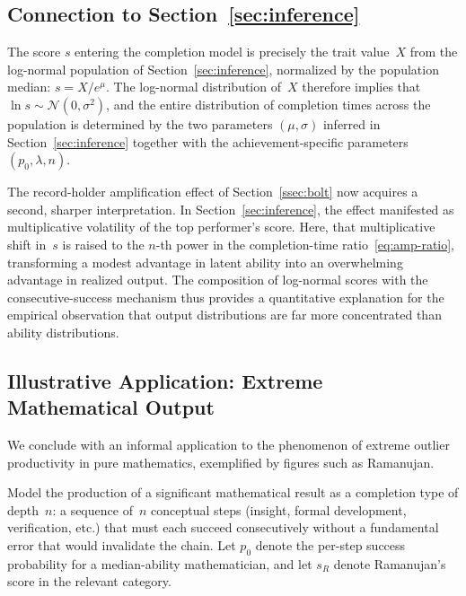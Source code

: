 \documentclass{article}
\begin{document}
\subsection{Connection to Section~\ref{sec:inference}}\label{ssec:connection}

The score $s$ entering the completion model is precisely the trait
value~$X$ from the log-normal population of
Section~\ref{sec:inference}, normalized by the population median:
$s = X / e^{\mu}$. The log-normal distribution of~$X$ therefore implies
that $\ln s \sim \mathcal{N}(0,\sigma^2)$, and the entire distribution
of completion times across the population is determined by the two
parameters $(\mu, \sigma)$ inferred in Section~\ref{sec:inference}
together with the achievement-specific parameters $(p_0, \lambda, n)$.

The record-holder amplification effect of Section~\ref{ssec:bolt} now
acquires a second, sharper interpretation. In Section~\ref{sec:inference},
the effect manifested as multiplicative volatility of the top performer's
score. Here, that multiplicative shift in~$s$ is raised to the $n$-th
power in the completion-time ratio~\eqref{eq:amp-ratio}, transforming a
modest advantage in latent ability into an overwhelming advantage in
realized output. The composition of log-normal scores with the
consecutive-success mechanism thus provides a quantitative explanation for
the empirical observation that output distributions are far more
concentrated than ability distributions.

\subsection{Illustrative Application: Extreme Mathematical
            Output}\label{ssec:ramanujan}

We conclude with an informal application to the phenomenon of extreme
outlier productivity in pure mathematics, exemplified by figures such as
Ramanujan.

Model the production of a significant mathematical result as a completion
type of depth~$n$: a sequence of~$n$ conceptual steps (insight, formal
development, verification, etc.) that must each succeed consecutively
without a fundamental error that would invalidate the chain. Let $p_0$
denote the per-step success probability for a median-ability mathematician,
and let $s_R$ denote Ramanujan's score in the relevant category.
\end{document}
